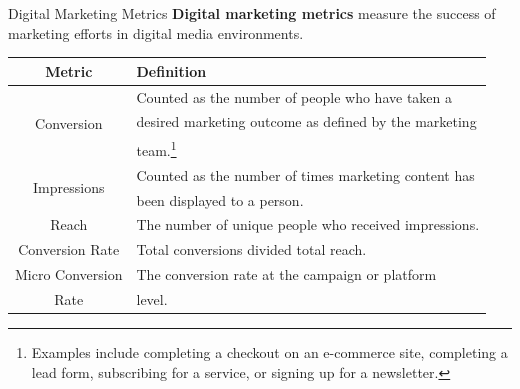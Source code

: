 \documentclass[pdf]{beamer}
\newcommand{\empr}[1]{{\color{franklinblue}\textbf{#1}}}
\theoremstyle{remark}
\theoremstyle{definition}
\begin{document}
\begin{frame}[t]{Digital Marketing Metrics}
\empr{Digital marketing metrics} measure the success of marketing efforts in digital media environments.\\
\vspace{0.0ex}
\footnotesize
\begin{table}[htbp]
  \centering
  \captionsetup{justification=centering}
    \begin{tabular}{|c|l|}
    \toprule
    Metric & Definition \\
    \midrule
    \multirow{3}{*}{Conversion} & Counted as the number of people who have taken a \\
                              & desired marketing outcome as defined by the marketing \\
                              & team.\footnote{Examples include completing a checkout on an e-commerce site, completing a lead  form, subscribing for a service, or signing up for a newsletter.} \\
   \midrule 
    \multirow{2}{*}{Impressions} & Counted as the number of times marketing content has\\
                                & been displayed to a person.\\
    \midrule
   Reach & The number of unique people who received impressions. \\
    \midrule 
   Conversion Rate & Total conversions divided total reach. \\ 
   \midrule 
    Micro Conversion & The conversion rate at the campaign or platform \\
    Rate & level. \\
    \bottomrule
     \end{tabular}%
  \label{tab:custmetrics}%
\end{table}%
\end{frame}
\end{document}
